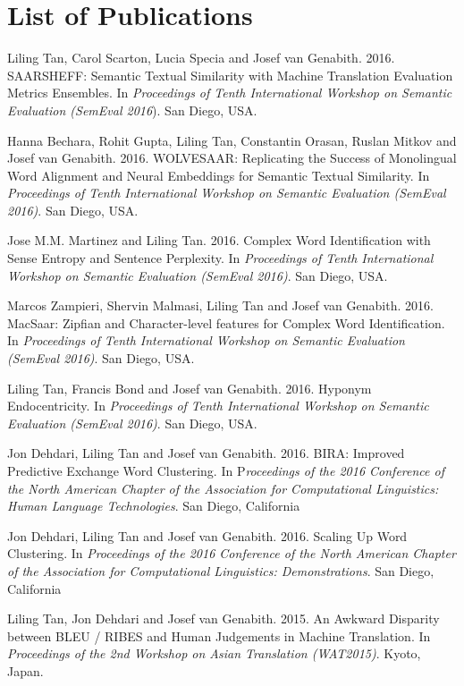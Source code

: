 \iffalse
\newpage
\section{List of Publications}

{\small
Liling Tan, Carol Scarton, Lucia Specia and Josef van Genabith. 2016. SAARSHEFF: Semantic Textual Similarity with Machine Translation Evaluation Metrics Ensembles. In \textit{Proceedings of Tenth International Workshop on Semantic Evaluation (SemEval 2016}). San Diego, USA. 

Hanna Bechara, Rohit Gupta, Liling Tan, Constantin Orasan, Ruslan Mitkov and Josef van Genabith. 2016. WOLVESAAR: Replicating the Success of Monolingual Word Alignment and Neural Embeddings for Semantic Textual Similarity. In \textit{Proceedings of Tenth International Workshop on Semantic Evaluation (SemEval 2016)}. San Diego, USA. 

Jose M.M. Martinez and Liling Tan. 2016. Complex Word Identification with Sense Entropy and Sentence Perplexity. In \textit{Proceedings of Tenth International Workshop on Semantic Evaluation (SemEval 2016)}. San Diego, USA.   

Marcos Zampieri, Shervin Malmasi, Liling Tan and Josef van Genabith. 2016. MacSaar: Zipfian and Character-level features for Complex Word Identification. In \textit{Proceedings of Tenth International Workshop on Semantic Evaluation (SemEval 2016)}. San Diego, USA.   

Liling Tan, Francis Bond and Josef van Genabith. 2016. Hyponym Endocentricity. In\textit{ Proceedings of Tenth International Workshop on Semantic Evaluation (SemEval 2016)}. San Diego, USA.   

Jon Dehdari, Liling Tan and Josef van Genabith. 2016. BIRA: Improved Predictive Exchange Word Clustering. In P\textit{roceedings of the 2016 Conference of the North American Chapter of the Association for Computational Linguistics: Human Language Technologies}. San Diego, California  

Jon Dehdari, Liling Tan and Josef van Genabith. 2016. Scaling Up Word Clustering. In \textit{Proceedings of the 2016 Conference of the North American Chapter of the Association for Computational Linguistics: Demonstrations}. San Diego, California   

Liling Tan, Jon Dehdari and Josef van Genabith. 2015. An Awkward Disparity between BLEU / RIBES and Human Judgements in Machine Translation. In \textit{Proceedings of the 2nd Workshop on Asian Translation (WAT2015)}. Kyoto, Japan.  

}
